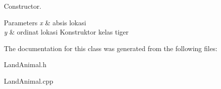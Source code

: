 Constructor. 


\begin{DoxyParams}{Parameters}
{\em x} & absis lokasi \\
\hline
{\em y} & ordinat lokasi Konstruktor kelas tiger \\
\hline
\end{DoxyParams}


The documentation for this class was generated from the following files\+:\begin{DoxyCompactItemize}
\item 
Land\+Animal.\+h\item 
Land\+Animal.\+cpp\end{DoxyCompactItemize}
